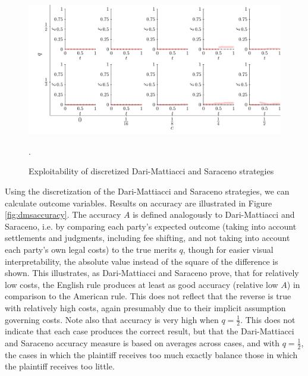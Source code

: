 \documentclass{article}
\begin{document}
\begin{figure}[h!]
\centering
\includegraphics[scale=0.60, trim={0.05in 0.15in 0in 0in}, clip]{../Figures/DMS formulas exploitability.pdf}
\vspace*{-2mm}
\caption{Exploitability of discretized Dari-Mattiacci and Saraceno strategies}. 
\label{fig:exploit}
\end{figure}

Using the discretization of the Dari-Mattiacci and Saraceno strategies, we can calculate outcome variables. Results on accuracy are illustrated in Figure \ref{fig:dmsaccuracy}. The accuracy $A$ is defined analogously to Dari-Mattiacci and Saraceno, i.e. by comparing each party's expected outcome (taking into account settlements and judgments, including fee shifting, and not taking into account each party's own legal costs) to the true merits $q$, though for easier visual interpretability, the absolute value instead of the square of the difference is shown. This illustrates, as Dari-Mattiacci and Saraceno prove, that for relatively low costs, the English rule produces at least as good accuracy (relative low $A$) in comparison to the American rule. This does not reflect that the reverse is true with relatively high costs, again presumably due to their implicit assumption governing costs. Note also that accuracy is very high when $q=\frac{1}{2}$. This does not indicate that each case produces the correct result, but that the Dari-Mattiacci and Saraceno accuracy measure is based on averages across cases, and with $q=\frac{1}{2}$, the cases in which the plaintiff receives too much exactly balance those in which the plaintiff receives too little. 
\end{document}
